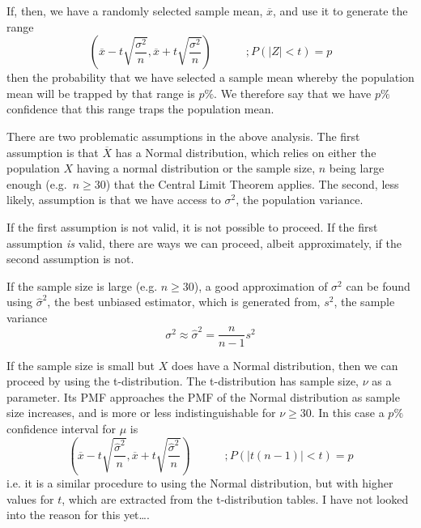 \documentclass[a5paper]{article}
\begin{document}
If, then, we have a randomly selected sample mean, $\overline{x}$, and use it to
generate the range
\begin{equation}
  \left(\overline{x} - t\sqrt{\frac{\sigma^2}{n}},
  \overline{x} + t\sqrt{\frac{\sigma^2}{n}}\right)
  \hspace{3em};P(|Z|<t) = p
\end{equation}
then the probability that we have selected a sample mean whereby the population
mean will be trapped by that range is $p\%$. We therefore say that we have $p\%$
confidence that this range traps the population mean.

There are two problematic assumptions in the above analysis. The first
assumption is that $\overline{X}$ has a Normal distribution, which relies on
either the population $X$ having a normal distribution or the sample size, $n$
being large enough (e.g.\ $n\ge30$) that the Central Limit Theorem applies. The
second, less likely, assumption is that we have access to $\sigma^2$, the
population variance.

If the first assumption is not valid, it is not possible to proceed. If the
first assumption \textit{is} valid, there are ways we can proceed, albeit
approximately, if the second assumption is not.

If the sample size is large (e.g. $n\ge 30$), a good approximation of $\sigma^2$
can be found using $\hat{\sigma}^2$, the best unbiased estimator, which is
generated from, $s^2$, the sample variance
\begin{equation}
  \sigma^2 \approx \hat{\sigma}^2 = \frac{n}{n-1}s^2
\end{equation}

If the sample size is small but $X$ does have a Normal distribution, then we can
proceed by using the t-distribution. The t-distribution has sample size, $\nu$
as a parameter. Its PMF approaches the PMF of the Normal distribution as sample
size increases, and is more or less indistinguishable for $\nu\ge 30$. In this
case a $p\%$ confidence interval for $\mu$ is
\begin{equation}
  \left(\overline{x} - t\sqrt{\frac{\hat{\sigma}^2}{n}},
  \overline{x} + t\sqrt{\frac{\hat{\sigma}^2}{n}}\right)
  \hspace{3em};P(|t(n-1)|<t) = p
\end{equation}
i.e. it is a similar procedure to using the Normal distribution, but with higher
values for $t$, which are extracted from the t-distribution tables. I have not
looked into the reason for this yet….
\end{document}

